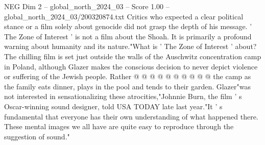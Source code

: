 \begin{textsample}{NEG Dim 2 – global\_north\_2024\_03 – Score 1.00 – global\_north\_2024\_03/200320874.txt}
Critics who expected a clear political stance or a film solely about genocide did not grasp the depth of his message. ' The Zone of Interest ' is not a film about the Shoah.
It is primarily a profound warning about humanity and its nature."What is ' The Zone of Interest ' about?
The chilling film is set just outside the walls of the Auschwitz concentration camp in Poland, although Glazer makes the conscious decision to never depict violence or suffering of the Jewish people.
Rather @ @ @ @ @ @ @ @ @ @ the camp as the family eats dinner, plays in the pool and tends to their garden.
Glazer"was not interested in sensationalizing these atrocities,"Johnnie Burn, the film ' s Oscar-winning sound designer, told USA TODAY late last year."It ' s fundamental that everyone has their own understanding of what happened there.
These mental images we all have are quite easy to reproduce through the suggestion of sound."

\end{textsample}
